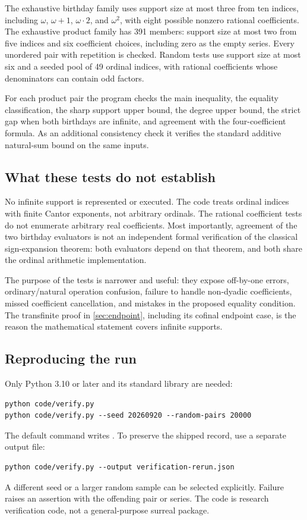 \documentclass[11pt,letterpaper]{article}
\theoremstyle{definition}
\theoremstyle{remark}
\begin{document}
The exhaustive birthday family uses support size at most three from ten
indices, including \(\omega\), \(\omega+1\), \(\omega\cdot2\), and
\(\omega^2\), with eight possible nonzero rational coefficients.
The exhaustive product family has 391 members: support size at most two
from five indices and six coefficient choices, including zero as the empty
series. Every unordered pair with repetition is checked. Random tests use
support size at most six and a seeded pool of 49 ordinal indices, with
rational coefficients whose denominators can contain odd factors.

For each product pair the program checks the main inequality, the equality
classification, the sharp support upper bound, the degree upper bound,
the strict gap when both birthdays are infinite, and agreement with the
four-coefficient formula. As an additional consistency check it verifies
the standard additive natural-sum bound on the same inputs.

\subsection{What these tests do not establish}
No infinite support is represented or executed. The code treats ordinal
indices with finite Cantor exponents, not arbitrary ordinals. The rational
coefficient tests do not enumerate arbitrary real coefficients. Most
importantly, agreement of the two birthday evaluators is not an
independent formal verification of the classical sign-expansion theorem:
both evaluators depend on that theorem, and both share the ordinal
arithmetic implementation.

The purpose of the tests is narrower and useful: they expose off-by-one
errors, ordinary/natural operation confusion, failure to handle
non-dyadic coefficients, missed coefficient cancellation, and mistakes in
the proposed equality condition. The transfinite proof in
\cref{sec:endpoint}, including its cofinal endpoint case, is the reason
the mathematical statement covers infinite supports.

\subsection{Reproducing the run}
Only Python 3.10 or later and its standard library are needed:
\begin{lstlisting}
python code/verify.py
python code/verify.py --seed 20260920 --random-pairs 20000
\end{lstlisting}
The default command writes . To preserve the
shipped record, use a separate output file:
\begin{lstlisting}
python code/verify.py --output verification-rerun.json
\end{lstlisting}
A different seed or a larger random sample can be selected explicitly.
Failure raises an assertion with the offending pair or series. The code
is research verification code, not a general-purpose surreal package.
\end{document}
